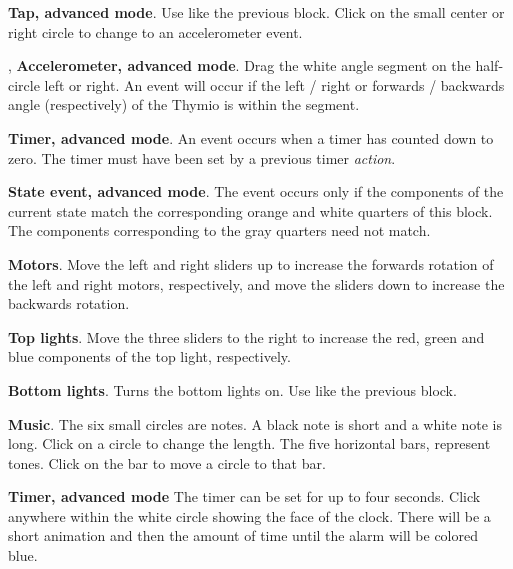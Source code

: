 \bigskip\bigskip\bigskip

 \textbf{Tap, advanced mode}. Use like the
previous block. Click on the small center or right circle to change to
an accelerometer event.

\bigskip\bigskip

,  \textbf{Accelerometer,
advanced mode}. Drag the white angle segment on the half-circle left or right.
An event will occur if the left / right or forwards / backwards angle
(respectively) of the Thymio is within the segment.

\bigskip\bigskip\bigskip\bigskip

 \textbf{Timer, advanced mode}. An event occurs when
a timer has counted down to zero. The timer must have been set by a
previous timer \emph{action}.

\bigskip\bigskip\bigskip

 \textbf{State event, advanced mode}. The event
occurs only if the components of the current state match the
corresponding orange and white quarters of this block. The components
corresponding to the gray quarters need not match.

\bigskip


 \textbf{Motors}. Move the left and right sliders
up to increase the forwards rotation of the left and right motors,
respectively, and move the sliders down to increase the backwards
rotation.

\bigskip\bigskip

 \textbf{Top lights}. Move the three sliders to
the right to increase the red, green and blue components of the top
light, respectively.

\bigskip\bigskip

 \textbf{Bottom lights}. Turns the bottom
lights on. Use like the previous block.

\bigskip\bigskip\bigskip\bigskip

 \textbf{Music}. The six small circles are notes. A
black note is short and a white note is long. Click on a circle to
change the length. The five horizontal bars, represent tones. Click on
the bar to move a circle to that bar.

\bigskip\bigskip

 \textbf{Timer, advanced mode} The timer can be set
for up to four seconds. Click anywhere within the white circle showing
the face of the clock. There will be a short animation and then the
amount of time until the alarm will be colored blue.

